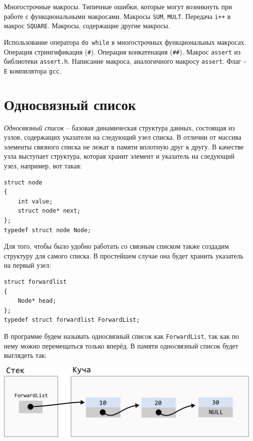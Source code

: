 \documentclass[10pt]{article}
\begin{document}
Многострочные макросы. Типичные ошибки, которые
могут возникнуть при работе с функциональными макросами. 
Макросы \texttt{SUM}, \texttt{MULT}. Передача \texttt{i++} в макрос \texttt{SQUARE}.
Макросы, содержащие другие макросы.

Использование оператора \texttt{do while} в
многострочных функциональных макросах. Операция стрингификация (\texttt{\#}). Операция конкатенация (\texttt{\#\#}).
Макрос \texttt{assert} из библиотеки \texttt{assert.h}. Написание макроса, аналогичного макросу \texttt{assert}. Флаг \texttt{-E} компилятора \texttt{gcc}.

\newpage
\section*{Односвязный список}

\textit{Односвязный список} -- базовая динамическая структура данных, состоящая из узлов, содержащих указатели на следующий узел списка. В отличии от массива элементы связного списка не лежат в памяти вплотную друг к другу. В качестве узла выступает структура, которая хранит элемент и указатель на следующий узел, например, вот такая:
\begin{lstlisting}
struct node 
{
    int value;
    struct node* next;
};
typedef struct node Node;
\end{lstlisting}

Для того, чтобы было удобно работать со связным списком также создадим структуру для самого списка. В простейшем случае она будет хранить указатель на первый узел:
\begin{lstlisting}
struct forwardlist 
{
    Node* head;
};
typedef struct forwardlist ForwardList;
\end{lstlisting}

В программе будем называть односвязный список как \texttt{ForwardList}, так как по нему можно перемещаться только вперёд. В памяти односвязный список будет выглядеть так:
\begin{center}
\includegraphics[scale=0.85]{../images/forward_list.png}
\end{center}
\end{document}
